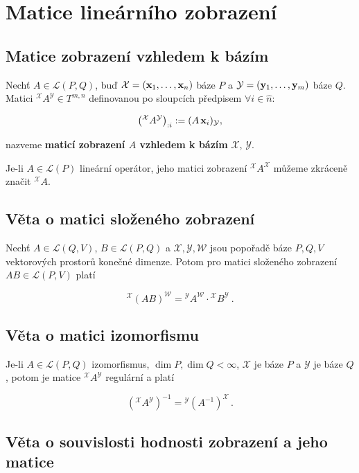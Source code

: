 \section{Matice lineárního zobrazení}

\subsection*{Matice zobrazení vzhledem k bázím}

Nechť $A\in\mathcal L(P,Q)$, buď $\mathcal X=(\mathbf{x}_1,\dots,\mathbf{x}_n)$ báze $P$ a
$\mathcal Y=(\mathbf{y}_1,\dots,\mathbf{y}_m)$ báze $Q$. Matici ${}^{\mathcal X}A^{\mathcal
    Y}\in T^{m,n}$ definovanou po sloupcích předpisem $\forall i\in \hat{n}:$

\[ \left({}^{\mathcal X}A^{\mathcal Y}\right)_{:i}:=(A\,\mathbf{x}_{i})_\mathcal Y, \]

\noindent nazveme \textbf{maticí zobrazení $A$ vzhledem k bázím} $\mathcal X$, $\mathcal Y$.

\noindent Je-li $A\in \mathcal L(P)$ lineární operátor, jeho matici zobrazení
${}^{\mathcal X}A^{\mathcal X}$ můžeme zkráceně značit ${}^{\mathcal X}A$.

\subsection*{Věta o matici složeného zobrazení}

Nechť $A\in\mathcal L(Q,V)$, $B\in\mathcal L(P,Q)$ a $\mathcal X, \mathcal Y,
    \mathcal{W}$ jsou popořadě báze $P, Q, V$ vektorových prostorů konečné dimenze.
Potom pro matici složeného zobrazení $AB\in\mathcal L(P,V)$ platí

\[ {}^{\mathcal X}(AB)^{\mathcal{W}}={}^{\mathcal Y}A^{\mathcal{W}}\cdot{}^{\mathcal X}B^{\mathcal Y}\ . \]

\subsection*{Věta o matici izomorfismu}

Je-li $A\in\mathcal L(P,Q)$ izomorfismus, $\dim P, \dim Q < \infty$, $\mathcal
    X$ je báze $P$ a $\mathcal Y$ je báze $Q$, potom je matice ${}^{\mathcal
            X}A^{\mathcal Y}$ regulární a platí

\[ \left({}^{\mathcal X}A^{\mathcal Y}\right)^{-1}={}^{\mathcal Y}(A^{-1})^{\mathcal X}\,. \]

\subsection*{Věta o souvislosti hodnosti zobrazení a jeho matice}

